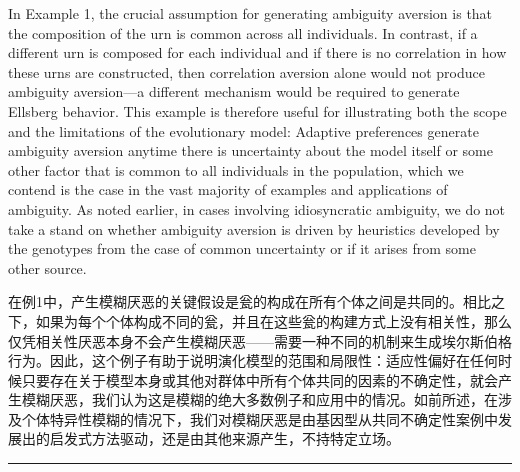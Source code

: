 \documentclass[12pt,a4paper]{article}
\newenvironment{original}
  {\par\noindent\color{black}\smallskip}
  {\par\smallskip}
\newenvironment{translation}
  {\par\noindent\color{blue!70!black}\smallskip}
  {\par\medskip\hrule\medskip}
\begin{document}
\begin{original}
In Example 1, the crucial assumption for generating ambiguity aversion is that the composition of the urn is common across all individuals. In contrast, if a different urn is composed for each individual and if there is no correlation in how these urns are constructed, then correlation aversion alone would not produce ambiguity aversion---a different mechanism would be required to generate Ellsberg behavior. This example is therefore useful for illustrating both the scope and the limitations of the evolutionary model: Adaptive preferences generate ambiguity aversion anytime there is uncertainty about the model itself or some other factor that is common to all individuals in the population, which we contend is the case in the vast majority of examples and applications of ambiguity. As noted earlier, in cases involving idiosyncratic ambiguity, we do not take a stand on whether ambiguity aversion is driven by heuristics developed by the genotypes from the case of common uncertainty or if it arises from some other source.
\end{original}
\begin{translation}
在例1中，产生模糊厌恶的关键假设是瓮的构成在所有个体之间是共同的。相比之下，如果为每个个体构成不同的瓮，并且在这些瓮的构建方式上没有相关性，那么仅凭相关性厌恶本身不会产生模糊厌恶——需要一种不同的机制来生成埃尔斯伯格行为。因此，这个例子有助于说明演化模型的范围和局限性：适应性偏好在任何时候只要存在关于模型本身或其他对群体中所有个体共同的因素的不确定性，就会产生模糊厌恶，我们认为这是模糊的绝大多数例子和应用中的情况。如前所述，在涉及个体特异性模糊的情况下，我们对模糊厌恶是由基因型从共同不确定性案例中发展出的启发式方法驱动，还是由其他来源产生，不持特定立场。
\end{translation}
\end{document}
